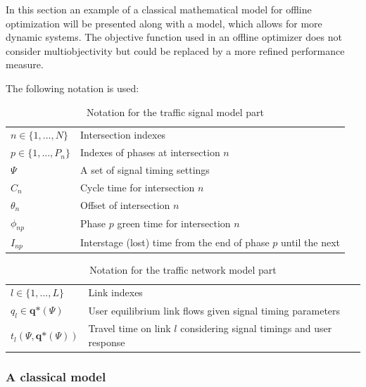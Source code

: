 \label{sec:model}

In this section an example of a classical mathematical model for
offline optimization will be presented along with a model, which
allows for more dynamic systems. The objective function used in an
offline optimizer does not consider multiobjectivity but could be
replaced by a more refined performance measure.

The following notation is used:

\begin{table}[!ht]
\begin{center}
\begin{tabular}{ll}
\hline
$n \in \lbrace 1,...,N \rbrace$ & Intersection indexes \\
$p \in \lbrace 1,...,P_n \rbrace$ & Indexes of phases at intersection $n$ \\ 
$\Psi$ & A set of signal timing settings \\
$C_n$ & Cycle time for intersection $n$ \\
$\theta_n$ & Offset of intersection $n$ \\
$\phi_{np}$ & Phase $p$ green time for intersection $n$  \\
$I_{np}$ & Interstage (lost) time from the end of phase $p$ until the next  \\
\hline
\end{tabular}
\end{center}
\caption{Notation for the traffic signal model part}
\end{table}

\begin{table}[!ht]
\begin{center}
\begin{tabular}{ll}
\hline
$l \in \lbrace 1,...,L \rbrace$ & Link indexes \\
$q_l \in \textbf{q*}(\Psi)$ & User equilibrium link flows given signal timing parameters  \\
$t_l(\Psi,\textbf{q*}(\Psi))$ & Travel time on link $l$ considering signal timings and user response \\
\hline
\end{tabular}
\end{center}
\caption{Notation for the traffic network model part}
\end{table}

\subsubsection*{A classical model}

